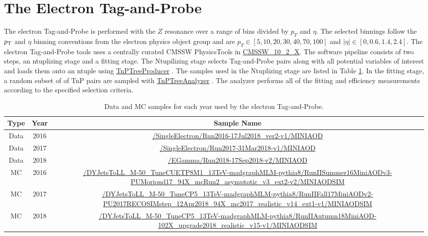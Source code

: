 \section{The Electron Tag-and-Probe }

The electron Tag-and-Probe is performed with the $Z$ resonance over a range of bins divided by $p_T$ and $\eta$. The selected binnings follow the $p_{\mathrm{T}}$ and $\eta$ binning conventions from the electron physics object group and are $ p_T \in [5, 10, 20, 30, 40, 70, 100]$ and $|\eta| \in [ 0, 0.6, 1.4, 2.4]$. The electron Tag-and-Probe tools uses a centrally curated CMSSW PhysicsTools in \url{CMSSW_10_2_X}. The software pipeline consists of two steps, an ntuplizing stage and a fitting stage. The  Ntupilizing stage selects Tag-and-Probe pairs along with all potential variables of interest and loads them onto an ntuple using \url{TnPTreeProducer} \cite{ElTnPGit}. The samples used in the Ntuplizing stage are listed in Table \ref{tab:electronTnPSamples}. In the fitting stage, a random subset of of TnP pairs are sampled with \url{TnPTreeAnalyzer} \cite{ElTnPAnaGit}. The analyzer performs all of the fitting and efficiency measurements according to the specified selection criteria. 

\begin{table}
\caption{ Data and MC samples for each year used by the electron Tag-and-Probe. }
\label{tab:electronTnPSamples}
\scriptsize
\begin{adjustwidth}{-0.5in}{-1in}
\begin{tabular}{cc|c}
\hline
Type & Year & Sample Name \\ 
\hline
\hline 
Data & 2016 & \tiny \url{/SingleElectron/Run2016-17Jul2018_ver2-v1/MINIAOD}  \\  
Data & 2017 & \tiny \url{/SingleElectron/Run2017-31Mar2018-v1/MINIAOD} \\  
Data & 2018 & \tiny \url{/EGamma/Run2018-17Sep2018-v2/MINIAOD} \\ 
\hline 
MC & 2016 & \tiny \url{/DYJetsToLL_M-50_TuneCUETP8M1_13TeV-madgraphMLM-pythia8/RunIISummer16MiniAODv3-PUMoriond17_94X_mcRun2_asymptotic_v3_ext2-v2/MINIAODSIM} \\ 
MC & 2017 & \tiny \url{/DYJetsToLL_M-50_TuneCP5_13TeV-madgraphMLM-pythia8/RunIIFall17MiniAODv2-PU2017RECOSIMstep_12Apr2018_94X_mc2017_realistic_v14_ext1-v1/MINIAODSIM} \\ 
MC & 2018 & \tiny \url{/DYJetsToLL_M-50_TuneCP5_13TeV-madgraphMLM-pythia8/RunIIAutumn18MiniAOD-102X_upgrade2018_realistic_v15-v1/MINIAODSIM} \\
\hline
\end{tabular} 
\end{adjustwidth}
\end{table}




